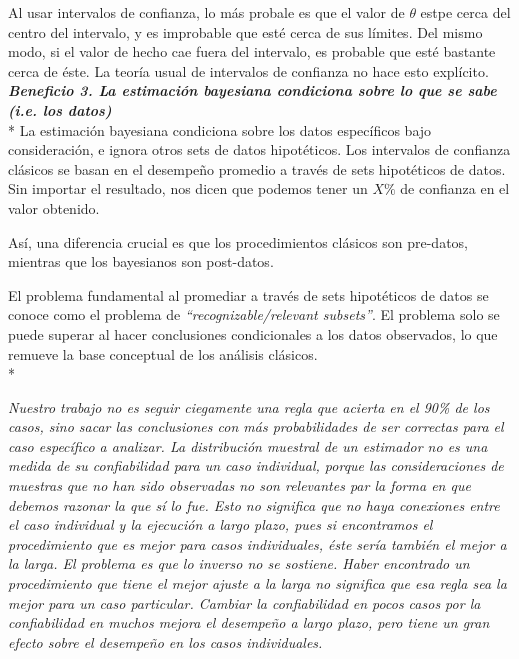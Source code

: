 \documentclass[a4paper,12pt]{article}
\begin{document}
Al usar intervalos de confianza, lo más probale es que el valor de $\theta$ estpe cerca del centro del intervalo, y es improbable que esté cerca de sus límites. Del mismo modo, si el valor de hecho cae fuera del intervalo, es probable que esté bastante cerca de éste. La teoría usual de intervalos de confianza no hace esto explícito.\\

{\slshape\bfseries Beneficio 3. La estimación bayesiana condiciona sobre lo que se sabe (i.e. los datos)}\\*
La estimación bayesiana condiciona sobre los datos específicos bajo consideración, e ignora otros sets de datos hipotéticos. Los intervalos de confianza clásicos se basan en el desempeño promedio a través de sets hipotéticos de datos. Sin importar el resultado, nos dicen que podemos tener un $X\%$ de confianza en el valor obtenido.

Así, una diferencia crucial es que los procedimientos clásicos son pre-datos, mientras que los bayesianos son post-datos.

El problema fundamental al promediar  a través de sets hipotéticos de datos se conoce como el  problema de {\slshape ``recognizable/relevant subsets''}. El problema solo se puede superar al hacer conclusiones condicionales a los datos observados, lo que remueve la base conceptual de los análisis clásicos.\\*

\parbox{14cm}{\slshape Nuestro trabajo no es seguir ciegamente una regla que acierta en el 90\% de los casos, sino sacar las conclusiones con más probabilidades de ser correctas para el caso específico a analizar. La distribución muestral de un estimador no es una medida de su confiabilidad para un caso individual, porque las consideraciones de muestras que no han sido observadas no son relevantes par la forma en que debemos razonar la que sí lo fue. Esto no significa que no haya conexiones entre el caso individual y la ejecución a largo plazo, pues si encontramos el procedimiento que es mejor para casos individuales, éste sería también el mejor a la larga. El problema es que lo inverso no se sostiene. Haber encontrado un procedimiento que tiene el mejor ajuste a la larga no significa que esa regla sea la mejor para un caso particular. Cambiar la confiabilidad en pocos casos por la confiabilidad en muchos mejora el desempeño a largo plazo, pero tiene un gran efecto sobre el desempeño en los casos individuales.}\\
\end{document}
